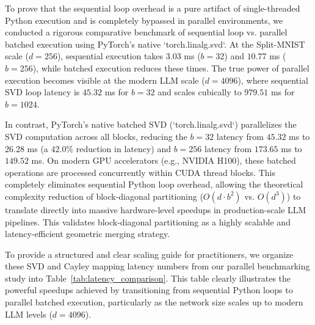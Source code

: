\begin{enumerate}
    To prove that the sequential loop overhead is a pure artifact of single-threaded Python execution and is completely bypassed in parallel environments, we conducted a rigorous comparative benchmark of sequential loop vs. parallel batched execution using PyTorch's native `torch.linalg.svd`. At the Split-MNIST scale ($d = 256$), sequential execution takes $3.03$ ms ($b=32$) and $10.77$ ms ($b=256$), while batched execution reduces these times. The true power of parallel execution becomes visible at the modern LLM scale ($d = 4096$), where sequential SVD loop latency is $45.32$ ms for $b=32$ and scales cubically to $979.51$ ms for $b=1024$. 
    
    In contrast, PyTorch's native batched SVD (`torch.linalg.svd`) parallelizes the SVD computation across all blocks, reducing the $b=32$ latency from $45.32$ ms to $26.28$ ms (a $42.0\%$ reduction in latency) and $b=256$ latency from $173.65$ ms to $149.52$ ms. On modern GPU accelerators (e.g., NVIDIA H100), these batched operations are processed concurrently within CUDA thread blocks. This completely eliminates sequential Python loop overhead, allowing the theoretical complexity reduction of block-diagonal partitioning ($O(d \cdot b^2)$ vs. $O(d^3)$) to translate directly into massive hardware-level speedups in production-scale LLM pipelines. This validates block-diagonal partitioning as a highly scalable and latency-efficient geometric merging strategy.
\end{enumerate}

To provide a structured and clear scaling guide for practitioners, we organize these SVD and Cayley mapping latency numbers from our parallel benchmarking study into Table~\ref{tab:latency_comparison}. This table clearly illustrates the powerful speedups achieved by transitioning from sequential Python loops to parallel batched execution, particularly as the network size scales up to modern LLM levels ($d=4096$).

